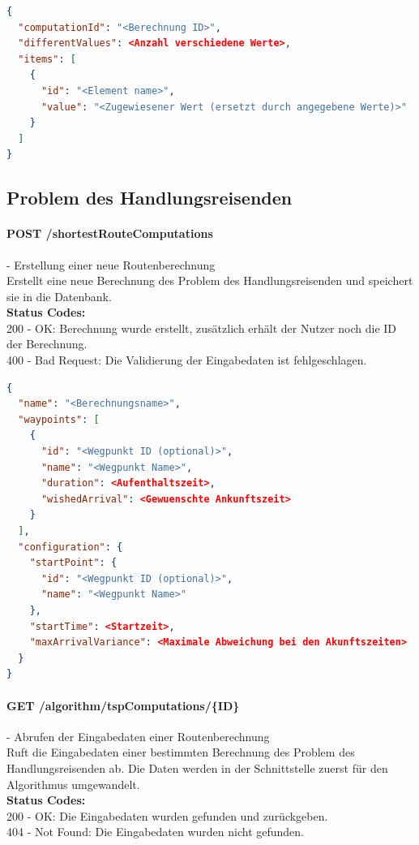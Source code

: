 \begin{lstlisting}[language=JSON, caption=Beispiel eines Endresultates für das Knotenfärbungsproblems, label=lst:solution_graphcoloring]  
{
  "computationId": "<Berechnung ID>",
  "differentValues": <Anzahl verschiedene Werte>,
  "items": [
    {
      "id": "<Element name>",
      "value": "<Zugewiesener Wert (ersetzt durch angegebene Werte)>"
    }
  ]
}
\end{lstlisting}

%
%
%
%

\subsection{Problem des Handlungsreisenden}

\paragraph{POST /shortestRouteComputations} - Erstellung einer neue Routenberechnung\mbox{}\\
Erstellt eine neue Berechnung des Problem des Handlungsreisenden und speichert sie in die Datenbank.\\
\textbf{Status Codes:}\\
200 - OK: Berechnung wurde erstellt, zusätzlich erhält der Nutzer noch die ID der Berechnung.\\
400 - Bad Request: Die Validierung der Eingabedaten ist fehlgeschlagen.\\

\begin{lstlisting}[language=JSON, caption=Beispiel einer Eingabe für das Problem des Handlungsreisenden, label=lst:input_tsp]  
{
  "name": "<Berechnungsname>",
  "waypoints": [
    {
      "id": "<Wegpunkt ID (optional)>",
      "name": "<Wegpunkt Name>",
      "duration": <Aufenthaltszeit>,
      "wishedArrival": <Gewuenschte Ankunftszeit>
    }
  ],
  "configuration": {
    "startPoint": {
      "id": "<Wegpunkt ID (optional)>",
      "name": "<Wegpunkt Name>"
    },
    "startTime": <Startzeit>,
    "maxArrivalVariance": <Maximale Abweichung bei den Akunftszeiten>
  }
}
\end{lstlisting}

\paragraph{GET /algorithm/tspComputations/\{ID\}} - Abrufen der Eingabedaten einer Routenberechnung\mbox{}\\
Ruft die Eingabedaten einer bestimmten Berechnung des Problem des Handlungsreisenden ab. Die Daten werden in der Schnittstelle zuerst für den Algorithmus umgewandelt.\\
\textbf{Status Codes:}\\
200 - OK: Die Eingabedaten wurden gefunden und zurückgeben.\\
404 - Not Found: Die Eingabedaten wurden nicht gefunden.\\


